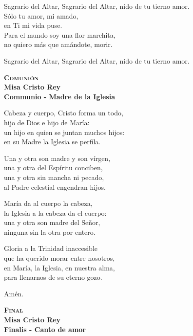 \documentclass[letterpaper]{report}
\begin{document}
    Sagrario del Altar, Sagrario del Altar, nido de tu tierno amor.\\

    S\'olo tu amor, mi amado,\\
    en Ti mi vida puse.\\
    Para el mundo soy una flor marchita,\\
    no quiero m\'as que am\'andote, morir.

    Sagrario del Altar, Sagrario del Altar, nido de tu tierno amor.
    \clearpage

    \begin{center}
        {\scshape \Huge {\bfseries Comuni\'on}} \\
        {\LARGE {\bfseries Misa Cristo Rey}} \\
        {\Large {\bfseries Communio - Madre de la Iglesia}}
    \end{center}
    
    Cabeza y cuerpo, Cristo forma un todo,\\
    hijo de Dios e hijo de Mar\'ia:\\
    un hijo en quien se juntan muchos hijos:\\
    en su Madre la Iglesia se perfila.

    Una y otra son madre y son v\'irgen,\\
    una y otra del Esp\'iritu conciben,\\
    una y otra sin mancha ni pecado,\\
    al Padre celestial engendran hijos.

    Mar\'ia da al cuerpo la cabeza,\\
    la Iglesia a la cabeza da el cuerpo:\\
    una y otra son madre del Se\~nor,\\
    ninguna sin la otra por entero.

    Gloria a la Trinidad inaccesible\\
    que ha querido morar entre nosotros,\\
    en Mar\'ia, la Iglesia, en nuestra alma,\\
    para llenarnos de su eterno gozo.

    Am\'en.
    \clearpage

    \begin{center}
        {\scshape \Huge {\bfseries Final}} \\
        {\LARGE {\bfseries Misa Cristo Rey}} \\
        {\Large {\bfseries Finalis - Canto de amor}}
    \end{center}
    
\end{document}
